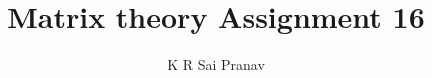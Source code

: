 \documentclass[journal,12pt,twocolumn]{IEEEtran}
\begin{document}
\makeatletter
{}
\makeatother
\let\StandardTheFigure\thefigure
\let\vec\mathbf
\renewcommand{\thefigure}{\theproblem}
\def\putbox#1#2#3{\makebox[0in][l]{\makebox[#1][l]{}\raisebox{\baselineskip}[0in][0in]{\raisebox{#2}[0in][0in]{#3}}}}
     \def\rightbox#1{\makebox[0in][r]{#1}}
     \def\centbox#1{\makebox[0in]{#1}}
     \def\topbox#1{\raisebox{-\baselineskip}[0in][0in]{#1}}
     \def\midbox#1{\raisebox{-0.5\baselineskip}[0in][0in]{#1}}
\vspace{3cm}
\title{Matrix theory Assignment 16}
\author{K R Sai Pranav}
%
%
%
% 
%
\end{document}
